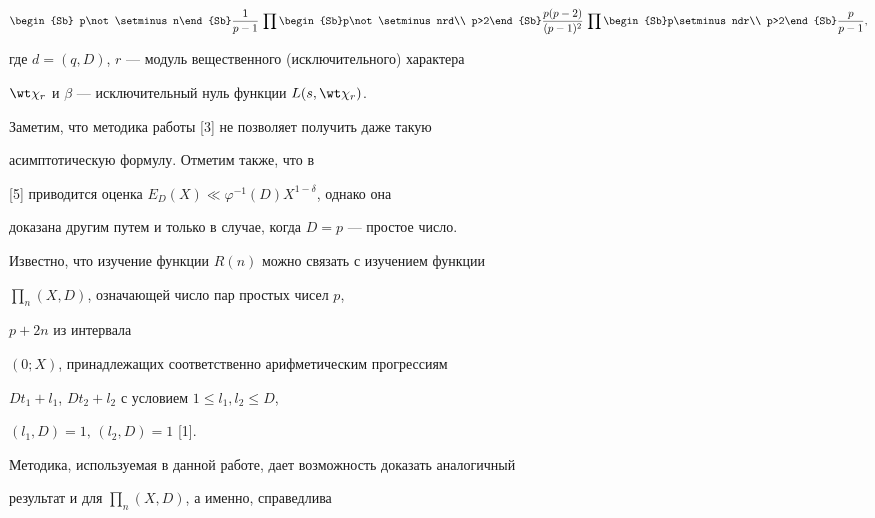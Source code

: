 \begin{thm}
\begin{gather*}
\begin{Sb}
p\not\setminus n\end{Sb}\frac1{p-1}\,


\prod\begin{Sb}p\not\setminus nrd\\ p>2\end{Sb}\frac{p(p-2)}{(p-1)^2}\,


\prod\begin{Sb}p\setminus ndr\\ p>2\end{Sb}\frac{p}{p-1}, 


\end{gather*}


где $d=(q,D)$, $r$ --- модуль вещественного (исключительного) характера


$\wt \chi_r$ и $\beta$ --- исключительный нуль функции $L(s,\wt \chi_r)$.


\end{thm}





Заметим, что методика работы [3] не позволяет получить даже такую 


асимптотическую формулу. Отметим также, что в


[5] приводится оценка $E_D(X)\ll \varphi^{-1}(D)X^{1-\delta}$, однако она 


доказана другим путем и только в случае, когда $D=p$ --- простое число.





Известно, что изучение функции $R(n)$ можно связать с изучением функции


$\prod_n(X,D)$, означающей число пар простых чисел $p$,


$p+2n$ из интервала


$(0;X)$, принадлежащих соответственно арифметическим прогрессиям 


$Dt_1+l_1$, $Dt_2+l_2$ с условием $1\le l_1,l_2\le D$,


$(l_1,D)=1,\,(l_2,D)=1$ [1].





Методика, используемая в данной работе, дает возможность доказать аналогичный


результат и для $\prod_n(X,D)$, а именно, справедлива





